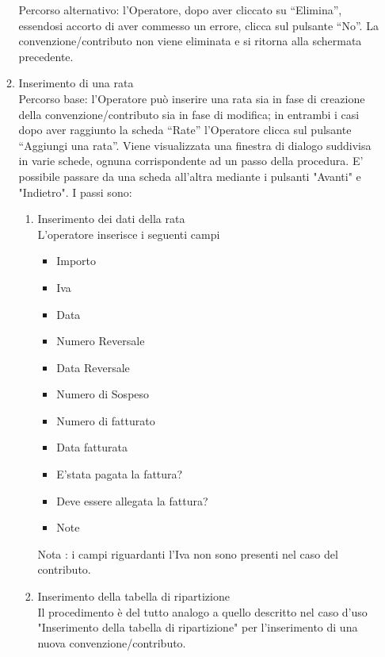 \begin{enumerate}
\begin{enumerate}
  Percorso alternativo:
  l'Operatore, dopo aver cliccato su ``Elimina'', essendosi accorto di aver commesso un errore, clicca sul pulsante ``No''. La convenzione/contributo non viene eliminata e si ritorna alla schermata precedente.
  
  
  
\item Inserimento di una rata\\ \label{UC_new_installment}
Percorso base:
l'Operatore può inserire una rata sia in fase di creazione della convenzione/contributo sia in fase di modifica; in entrambi i casi dopo aver raggiunto
la scheda ``Rate'' l'Operatore clicca sul pulsante ``Aggiungi una rata''.  
Viene visualizzata una finestra di dialogo suddivisa in varie schede,
ognuna corrispondente ad un passo della procedura. E' possibile passare da una scheda all'altra mediante i pulsanti "Avanti" e "Indietro". I passi sono:
\begin{enumerate}
  \item Inserimento dei dati della rata\\
  
  L'operatore inserisce i seguenti campi
    \begin{itemize}
    \item Importo
    \item Iva
    \item Data
    \item Numero Reversale
    \item Data Reversale
    \item Numero di Sospeso
    \item Numero di fatturato
    \item Data fatturata
    \item E'stata pagata la fattura?
    \item Deve essere allegata la fattura?
    \item Note
    \end{itemize}
    
   Nota : i campi riguardanti l'Iva non sono presenti nel caso del contributo.

   
  \item Inserimento della tabella di ripartizione\\
  
  Il procedimento è del tutto analogo a quello descritto nel caso d'uso "Inserimento della tabella di ripartizione" per l'inserimento di 
  una nuova convenzione/contributo. 
\end{enumerate}


\end{enumerate}
\end{enumerate}
